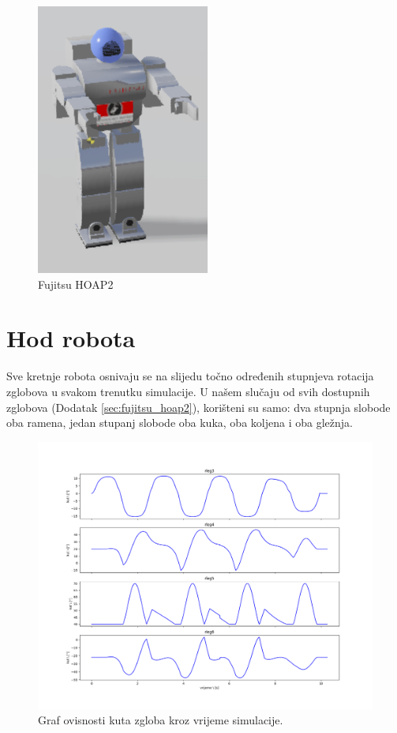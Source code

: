 \documentclass[times, utf8, zavrsni]{fer}
\begin{document}
\begin{figure}[htb!]
\centering
\includegraphics[height=0.42\textwidth]{hoap2.png}
\caption{Fujitsu HOAP2}
\label{fig:hoap2}
\end{figure}

\newpage
\section{Hod robota}
Sve kretnje robota osnivaju se na slijedu točno određenih stupnjeva rotacija zglobova u svakom trenutku simulacije. U našem slučaju od svih dostupnih zglobova (Dodatak \ref{sec:fujitsu_hoap2}), korišteni su samo: dva stupnja slobode oba ramena, jedan stupanj slobode oba kuka, oba koljena i oba gležnja.


\begin{figure}[htb!]
\centering
\includegraphics[width=1.0\textwidth]{anglesLeg.png}
\caption{Graf ovisnosti kuta zgloba kroz vrijeme simulacije.}
\label{fig:leg_angles}
\end{figure}
\end{document}
